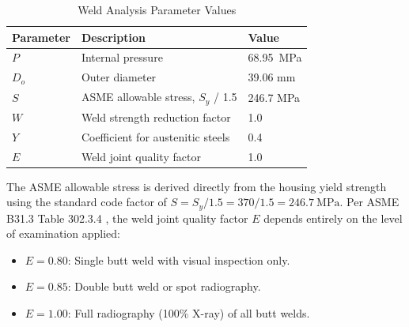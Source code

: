 \documentclass[12pt, letterpaper]{report}%
\newcommand{\specPressure}{68.95}%
\begin{document}
            \begin{table}[H]
                \centering
                \caption{Weld Analysis Parameter Values}
                \label{tab:weld_parameters}
                \begin{tabularx}{\textwidth}{l X l}
                    \toprule
                    \textbf{Parameter} & \textbf{Description} & \textbf{Value} \\
                    \midrule
                    $P$ &
                    Internal pressure &
                    \specPressure\ MPa
                    \\\addlinespace
                    $D_o$ &
                    Outer diameter &
                    39.06 mm
                    \\\addlinespace
                    $S$ &
                    ASME allowable stress, $S_y$ / 1.5 &
                    246.7 MPa
                    \\\addlinespace
                    $W$ &
                    Weld strength reduction factor &
                    1.0
                    \\\addlinespace
                    $Y$ &
                    Coefficient for austenitic steels &
                    0.4
                    \\\addlinespace
                    $E$ &
                    Weld joint quality factor &
                    1.0
                    \\\bottomrule
                \end{tabularx}
            \end{table}

            The ASME allowable stress is derived directly from the housing yield strength using the standard 
            code factor of $S = S_y / 1.5 = 370 / 1.5 = 246.7\ \text{MPa}$.
            Per ASME B31.3 Table 302.3.4 \cite{asme_b313}, the weld joint quality factor $E$ depends entirely 
            on the level of examination applied:

            \begin{itemize}
                \item $E = 0.80$: Single butt weld with visual inspection only.
                \item $E = 0.85$: Double butt weld or spot radiography.
                \item $E = 1.00$: Full radiography (100\% X-ray) of all butt welds.
            \end{itemize}
\end{document}
